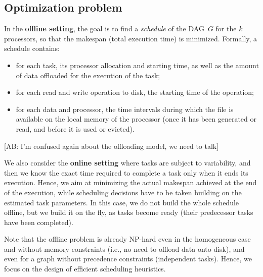 \documentclass[conference]{IEEEtran}
\newcommand{\skug}[1]{{\color{blue}[SK: #1]}}
\newcommand{\hmey}[1]{{\color{red}[HM: #1]}}
\newcommand{\AB}[1]{{\color{purple}[AB: #1]}}
\begin{document}
\subsection{Optimization problem}
\label{sec.mod.pb}

In the {\bf offline setting}, the goal is to find a {\em schedule} of the DAG~$G$ for the $k$ processors,
so that the makespan (total execution time) is minimized. Formally, a schedule contains:
\begin{itemize}
\item for each task, its processor allocation and starting time, 
as well as the amount of data offloaded for the execution of the task; 
\item for each read and write operation to disk, the starting time of the operation; 
\item for each data and processor, the time intervals during which the file is available
on the local memory of the processor (once it has been generated or read, and before 
it is used or evicted). 
\end{itemize}


\AB{I'm confused again about the offloading model, we need to talk}



\medskip
We also consider the {\bf online setting} where tasks are subject to variability, 
and then we know the exact time required to complete a task only when 
it ends its execution. Hence, we aim at minimizing the actual makespan
achieved at the end of the execution, while scheduling decisions 
have to be taken building
on the estimated task parameters.
In this case, we do not build the whole schedule offline, but we build
it on the fly, as tasks become ready (their predecessor tasks have been completed). 


Note that the offline problem is already NP-hard even in the homogeneous case and 
without memory constraints (i.e., no need to offload data onto disk), and even for
a graph without precedence constraints (independent tasks). 
Hence, we focus on the design of efficient scheduling heuristics. 
\end{document}
